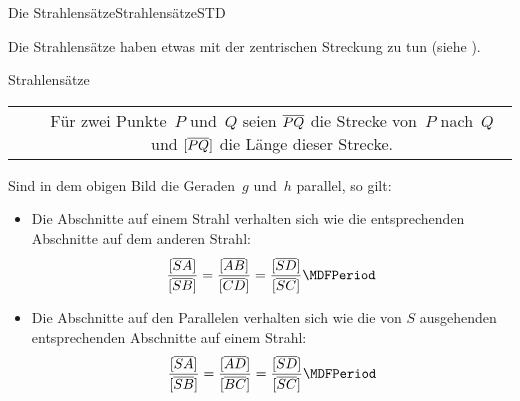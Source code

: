 \begin{MXContent}{Die Strahlens\"atze}{Strahlens\"atze}{STD}

Die Strahlens\"atze haben etwas mit der zentrischen Streckung zu tun 
(siehe ).


\ifttm%
\relax
\else%
\newcommand{\Strahlensatzfigur}[1][]
{%
\coordinate (S) at (0,0);
\coordinate (A) at ($ (S) + (3,0.5) $);
\coordinate (D) at ($ (S) + (4,2.5) $);
\coordinate (B) at ($ (S)!1.7!(A) $);
\coordinate (C) at ($ (S)!1.7!(D) $);
%
\path (S) node[left]{$S$} (A) node[below right]{$A$} (B) node[below right]{$B$}
                          (C) node[above left] {$C$} (D) node[above left] {$D$};
%
\draw (S) -- ($ (S)!1.1!(B) $);
\draw (S) -- ($ (S)!1.1!(C) $);
%
\draw[#1] ($ (A)!-0.2!(D) $) -- ($ (D)!-1!(A) $) node[left]{$g$};
\draw ($ (B)!-0.2!(C) $) node[right]{$h$} -- ($ (C)!-0.1!(B) $);
}
\fi

\begin{MXInfo}{Strahlens\"atze}%

\begin{tabular}{lc}
\mbox{
\MTikzAuto{%
\begin{tikzpicture}
\Strahlensatzfigur
\end{tikzpicture}
}
}
&
\begin{minipage}[b]{7cm}
F\"ur zwei Punkte~$P$ und~$Q$ seien $\overline{PQ}$ die Strecke von~$P$ 
nach~$Q$ und $[\overline{PQ}]$ die L\"ange dieser Strecke.
\vspace*{2cm}
\end{minipage}
\end{tabular}


Sind in dem obigen Bild die Geraden~$g$ und~$h$ parallel, so gilt:
\begin{itemize}
\item
Die Abschnitte auf einem Strahl verhalten sich wie die entsprechenden 
Abschnitte auf dem anderen Strahl:
\[
   \frac{\MGeoAbstand{S}{A}}{\MGeoAbstand{S}{B}}
 = \frac{\MGeoAbstand{A}{B}}{\MGeoAbstand{C}{D}}
 = \frac{\MGeoAbstand{S}{D}}{\MGeoAbstand{S}{C}} \MDFPeriod
\]
\item
Die Abschnitte auf den Parallelen  verhalten sich wie die von $S$ ausgehenden 
entsprechenden Abschnitte auf einem Strahl:
\[
   \frac{\MGeoAbstand{S}{A}}{\MGeoAbstand{S}{B}}
 = \frac{\MGeoAbstand{A}{D}}{\MGeoAbstand{B}{C}}
 = \frac{\MGeoAbstand{S}{D}}{\MGeoAbstand{S}{C}} \MDFPeriod
\]

\end{itemize}
\end{MXInfo}

\end{MXContent}


